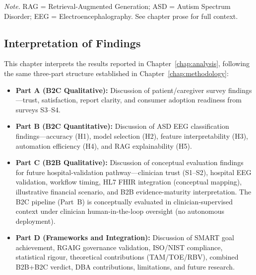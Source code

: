 \vspace{0.3em}\noindent\textit{Note.} RAG = Retrieval-Augmented Generation; ASD = Autism Spectrum Disorder; EEG = Electroencephalography. See chapter prose for full context.
\endgroup


\subsection{Interpretation of Findings}

This chapter interprets the results reported in Chapter~\ref{chap:analysis}, following the same three-part structure established in Chapter~\ref{chap:methodology}:

\begin{itemize}[leftmargin=*, itemsep=3pt]
    \item \textbf{Part A (B2C Qualitative):} Discussion of patient/caregiver survey findings---trust, satisfaction, report clarity, and consumer adoption readiness from surveys S3--S4.
    \item \textbf{Part B (B2C Quantitative):} Discussion of ASD EEG classification findings---accuracy (H1), model selection (H2), feature interpretability (H3), automation efficiency (H4), and RAG explainability (H5).
    \item \textbf{Part C (B2B Qualitative):} Discussion of conceptual evaluation findings for future hospital-validation pathway---clinician trust (S1--S2), hospital EEG validation, workflow timing, HL7 FHIR integration (conceptual mapping), illustrative financial scenario, and B2B evidence-maturity interpretation. The B2C pipeline (Part~B) is conceptually evaluated in clinician-supervised context under clinician human-in-the-loop oversight (no autonomous deployment).
    \item \textbf{Part D (Frameworks and Integration):} Discussion of SMART goal achievement, RGAIG governance validation, ISO/NIST compliance, statistical rigour, theoretical contributions (TAM/TOE/RBV), combined B2B+B2C verdict, DBA contributions, limitations, and future research.
\end{itemize}

